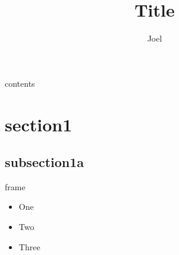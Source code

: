 \documentclass{beamer}
\author{Joel}
\title{Title}
\begin{document}
\begin{frame}
  \maketitle
\end{frame}

\begin{frame}{contents}
  \tableofcontents
\end{frame}

\section{section1}
\subsection{subsection1a}

\begin{frame}{frame}
  \begin{itemize}
    \item One
    \item<2-> Two
    \item<3-> Three
  \end{itemize}
\end{frame}
\end{document}
